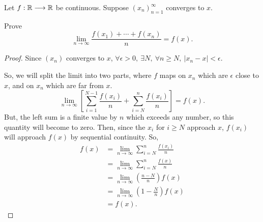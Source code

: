 \documentclass[../hw2]{subfiles}
\begin{document}
\begin{problem}[5]
Let $f:\mathbb{R}\longrightarrow\mathbb{R}$ be continuous. Suppose ${(x_n)}_{n=1}^{\infty}$   converges to $x$.

Prove \[
	\lim\limits_{n\to \infty}\frac{f(x_1)+\cdots+f(x_{n})}{n}=f(x)
	.\]
\end{problem}
\begin{proof}
	Since $(x_n)$ converges to  $x$,  $\forall \epsilon >0,\ \exists N,\ \forall n\ge N,\ |x_n-x|<\epsilon$.

	So, we will split the limit into two parts, where $f$ maps on  $x_n$ which are  $\epsilon$ close to  $x$, and on  $x_n$ which are far from $x$. \[
		\lim_{n\to \infty}\left[ \sum\limits_{i=1}^{N-1}\frac{f(x_i)}{n}+\sum\limits_{i=N}^{n}\frac{f(x_i)}{n} \right] = f(x)
		.\]
	But, the left sum is a finite value by $n$ which exceeds any number, so this quantity will become to zero. Then, since the $x_i$ for $i\ge N$ approach $x$,  $f(x_i)$ will approach  $f(x)$ by sequential continuity. So,
	\begin{align*}
		f(x) & = \lim_{n\to \infty}\sum\limits_{i=N}^{n}\frac{f(x_i)}{n} \\
		     & = \lim_{n\to \infty}\sum\limits_{i=N}^{n}\frac{f(x)}{n}   \\
		     & = \lim_{n\to \infty}\left(\frac{n-N}{n}\right)f(x)        \\
		     & = \lim_{n \to \infty} \left( 1-\frac{N}{n} \right) f(x)   \\
		     & = f(x)
		.\end{align*}
\end{proof}
\end{document}
